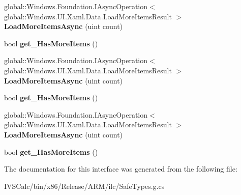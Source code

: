 \begin{DoxyCompactItemize}
global\+::\+Windows.\+Foundation.\+I\+Async\+Operation$<$ global\+::\+Windows.\+U\+I.\+Xaml.\+Data.\+Load\+More\+Items\+Result $>$ {\bfseries Load\+More\+Items\+Async} (uint count)
\item 
\mbox{\label{interface_windows_1_1_u_i_1_1_xaml_1_1_data_1_1_i_support_incremental_loading_a945d3d55106fecefe395d317500cef48}} 
bool {\bfseries get\+\_\+\+Has\+More\+Items} ()
\item 
\mbox{\label{interface_windows_1_1_u_i_1_1_xaml_1_1_data_1_1_i_support_incremental_loading_a088da056046c52ceef07d8ae51bbf566}} 
global\+::\+Windows.\+Foundation.\+I\+Async\+Operation$<$ global\+::\+Windows.\+U\+I.\+Xaml.\+Data.\+Load\+More\+Items\+Result $>$ {\bfseries Load\+More\+Items\+Async} (uint count)
\item 
\mbox{\label{interface_windows_1_1_u_i_1_1_xaml_1_1_data_1_1_i_support_incremental_loading_a945d3d55106fecefe395d317500cef48}} 
bool {\bfseries get\+\_\+\+Has\+More\+Items} ()
\item 
\mbox{\label{interface_windows_1_1_u_i_1_1_xaml_1_1_data_1_1_i_support_incremental_loading_a088da056046c52ceef07d8ae51bbf566}} 
global\+::\+Windows.\+Foundation.\+I\+Async\+Operation$<$ global\+::\+Windows.\+U\+I.\+Xaml.\+Data.\+Load\+More\+Items\+Result $>$ {\bfseries Load\+More\+Items\+Async} (uint count)
\item 
\mbox{\label{interface_windows_1_1_u_i_1_1_xaml_1_1_data_1_1_i_support_incremental_loading_a945d3d55106fecefe395d317500cef48}} 
bool {\bfseries get\+\_\+\+Has\+More\+Items} ()
\end{DoxyCompactItemize}


The documentation for this interface was generated from the following file\+:\begin{DoxyCompactItemize}
\item 
I\+V\+S\+Calc/bin/x86/\+Release/\+A\+R\+M/ilc/Safe\+Types.\+g.\+cs\end{DoxyCompactItemize}
